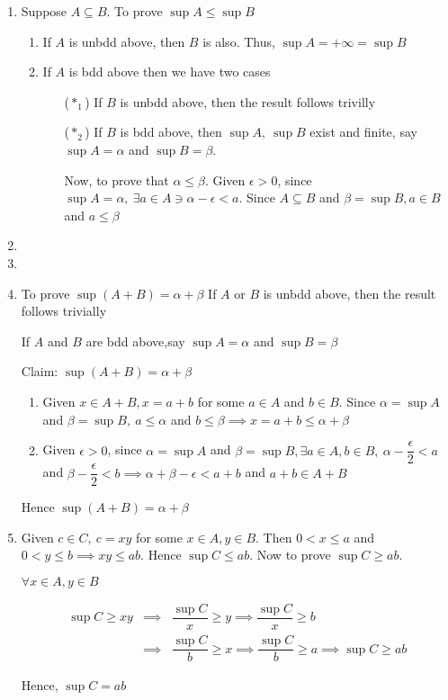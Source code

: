 \begin{solution}$ $
		\begin{enumerate}[wide]
			\item Suppose $A \subseteq B$. To prove $\sup A \leq \sup B$
			\begin{enumerate}[label = $(*)$]
				\item If $A$ is unbdd above, then $B$ is also. Thus, $\sup A = + \infty = \sup B$
				\item If $A$ is bdd above then we have two cases
					\begin{enumerate}
						\item[($*_1$)] If $B$ is unbdd above, then the result follows trivilly
						\item[($*_2$)] If $B$ is bdd above, then $\sup A,~\sup B$ exist and finite, say $\sup A = \alpha$ and $\sup B = \beta$.
						
						Now, to prove that $\alpha \leq \beta$. Given $\epsilon > 0$, since $\sup A = \alpha,~\exists a \in A \ni \alpha - \epsilon < a$. Since $A \subseteq B$ and $\beta = \sup B, a \in B$ and $a \leq \beta$
					\end{enumerate}
			\end{enumerate}
			\item 
			\item 
			\item To prove $\sup (A+B) = \alpha + \beta$ If $A$ or $B$ is unbdd above, then the result follows trivially
			
			If $A$ and $B$ are bdd above,say $\sup A = \alpha$ and $\sup B = \beta$
			
			Claim: $\sup (A+B) = \alpha + \beta$
			\begin{enumerate}
				\item Given $x \in A + B, x = a+b$ for some $a \in A$ and $b \in B$. Since $\alpha = \sup A$ and $\beta = \sup B,~ a \leq \alpha $ and $b \leq \beta \implies x = a+b \leq \alpha + \beta$
				\item Given $\epsilon > 0$, since $\alpha = \sup A$ and $\beta = \sup B, \exists a \in A,b \in B,~ \alpha - \dfrac{\epsilon}{2} < a$ and $\beta - \dfrac{\epsilon}{2} < b \implies \alpha + \beta - \epsilon < a+b$ and $a + b \in A + B$
 			\end{enumerate}
 			Hence $\sup (A+B) = \alpha + \beta$
			\item Given $c \in C,~ c = xy$ for some $x \in A, y \in B$. Then $0 < x \leq a$ and $0 < y \leq b \implies xy \leq ab$. Hence $\sup C \leq ab$. Now to prove $\sup C \geq ab$.
			
			$\forall x \in A, y \in B$
			
			\begin{eqnarray*}
				 \sup C \geq xy &\implies& \dfrac{\sup C}{x} \geq y \implies \dfrac{\sup C}{x} \geq b\\
				 &\implies& \dfrac{\sup C}{b} \geq x \implies \dfrac{\sup C}{b} \geq a \implies \sup C \geq ab
			\end{eqnarray*}
			
			Hence, $\sup C = ab$
			
		\end{enumerate}
\end{solution}